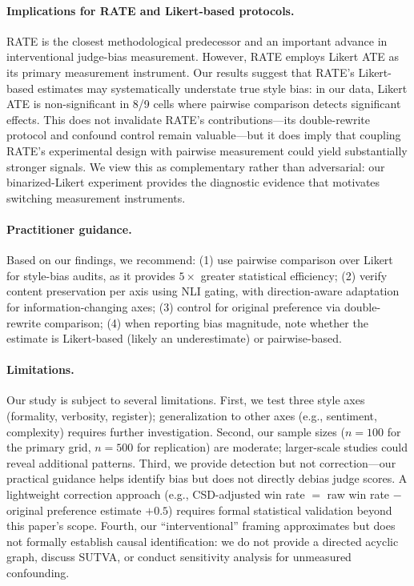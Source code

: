 \documentclass[11pt]{article}
\begin{document}
\paragraph{Implications for RATE and Likert-based protocols.}
RATE \cite{feuer2025rate} is the closest methodological predecessor and an important advance in interventional judge-bias measurement.
However, RATE employs Likert ATE as its primary measurement instrument.
Our results suggest that RATE's Likert-based estimates may systematically understate true style bias: in our data, Likert ATE is non-significant in 8/9 cells where pairwise comparison detects significant effects.
This does not invalidate RATE's contributions---its double-rewrite protocol and confound control remain valuable---but it does imply that coupling RATE's experimental design with pairwise measurement could yield substantially stronger signals.
We view this as complementary rather than adversarial: our binarized-Likert experiment provides the diagnostic evidence that motivates switching measurement instruments.

\paragraph{Practitioner guidance.}
Based on our findings, we recommend: (1) use pairwise comparison over Likert for style-bias audits, as it provides $5\times$ greater statistical efficiency; (2) verify content preservation per axis using NLI gating, with direction-aware adaptation for information-changing axes; (3) control for original preference via double-rewrite comparison; (4) when reporting bias magnitude, note whether the estimate is Likert-based (likely an underestimate) or pairwise-based.

\paragraph{Limitations.}
Our study is subject to several limitations.
First, we test three style axes (formality, verbosity, register); generalization to other axes (e.g., sentiment, complexity) requires further investigation.
Second, our sample sizes ($n = 100$ for the primary grid, $n = 500$ for replication) are moderate; larger-scale studies could reveal additional patterns.
Third, we provide detection but not correction---our practical guidance helps identify bias but does not directly debias judge scores.
A lightweight correction approach (e.g., CSD-adjusted win rate $=$ raw win rate $-$ original preference estimate $+ 0.5$) requires formal statistical validation beyond this paper's scope.
Fourth, our ``interventional'' framing approximates but does not formally establish causal identification: we do not provide a directed acyclic graph, discuss SUTVA, or conduct sensitivity analysis for unmeasured confounding.
\end{document}
